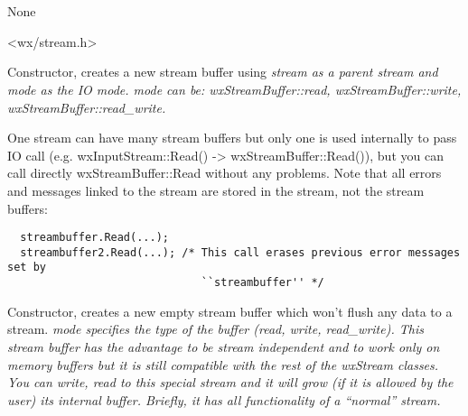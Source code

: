 \section{}\label{wxstreambuffer}


None


<wx/stream.h>




\label{wxstreambufconst}


Constructor, creates a new stream buffer using \it{stream} as a parent stream
and \it{mode} as the IO mode. \it{mode} can be: wxStreamBuffer::read,
wxStreamBuffer::write, wxStreamBuffer::read\_write.


One stream can have many stream buffers but only one is used internally to
pass IO call (e.g. wxInputStream::Read() -> wxStreamBuffer::Read()), but you
can call directly wxStreamBuffer::Read without any problems. Note that
all errors and messages linked to the stream are stored in the stream, not
the stream buffers:

\begin{verbatim}
  streambuffer.Read(...);
  streambuffer2.Read(...); /* This call erases previous error messages set by 
                              ``streambuffer'' */
\end{verbatim}


Constructor, creates a new empty stream buffer which won't flush any data
to a stream. \it{mode} specifies the type of the buffer (read, write, read\_write).
This stream buffer has the advantage to be stream independent and to
work only on memory buffers but it is still compatible with the rest of the
wxStream classes. You can write, read to this special stream and it will
grow (if it is allowed by the user) its internal buffer. Briefly, it has all
functionality of a ``normal'' stream.

